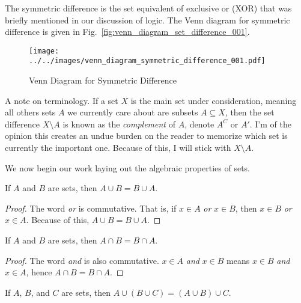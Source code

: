             The symmetric difference is the set equivalent of exclusive or
            (XOR) that was briefly mentioned in our discussion of logic.
            The Venn diagram for symmetric difference is given in
            Fig.~\ref{fig:venn_diagram_set_difference_001}.
            \begin{figure}[H]
                \centering
                \texttt{[image: ../../images/venn\_diagram\_symmetric\_difference\_001.pdf]}
                \caption{Venn Diagram for Symmetric Difference}
                \label{fig:venn_diagram_symmetric_difference_001}
            \end{figure}
            A note on terminology. If a set $X$ is the main set under
            consideration, meaning all others sets $A$ we currently care about
            are subsets $A\subseteq{X}$, then the set difference
            $X\setminus{A}$ is known as the \textit{complement} of $A$,
            denote $A^{C}$ or $A'$. I'm of the opinion this creates an
            undue burden on the reader to memorize which set is currently the
            important one. Because of this, I will stick with
            $X\setminus{A}$.
            \par\hfill\par
            We now begin our work laying out the algebraic properties of sets.
            \begin{theorem}
                If $A$ and $B$ are sets, then
                $A\cup{B}=B\cup{A}$.
            \end{theorem}
            \begin{proof}
                The word \textit{or} is commutative. That is, if
                $x\in{A}$ \textit{or} $x\in{B}$, then $x\in{B}$ \textit{or}
                $x\in{A}$. Because of this, $A\cup{B}=B\cup{A}$.
            \end{proof}
            \begin{theorem}
                If $A$ and $B$ are sets, then $A\cap{B}=B\cap{A}$.
            \end{theorem}
            \begin{proof}
                The word \textit{and} is also commutative. $x\in{A}$
                \textit{and} $x\in{B}$ means $x\in{B}$ \textit{and}
                $x\in{A}$, hence $A\cap{B}=B\cap{A}$.
            \end{proof}
            \begin{theorem}
                If $A$, $B$, and $C$ are sets, then
                $A\cup(B\cup{C})=(A\cup{B})\cup{C}$.
            \end{theorem}

